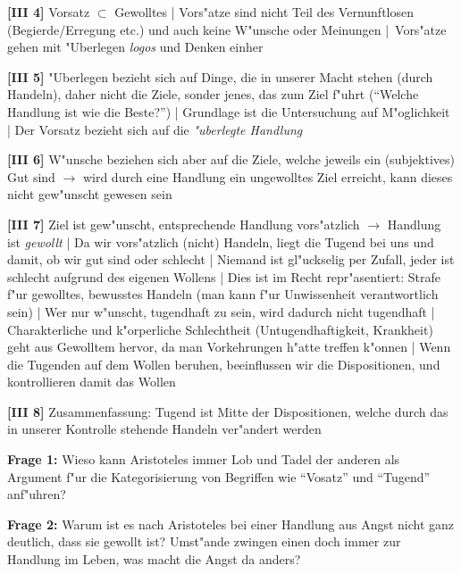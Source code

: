 \documentclass[emulatestandardclasses]{scrartcl}
\begin{document}
\noindent \textbf{[III 4]} Vorsatz $\subset$ Gewolltes | Vors"atze sind nicht Teil des Vernunftlosen (Begierde/Erregung etc.) und auch keine W"unsche oder Meinungen | Vors"atze gehen mit "Uberlegen \emph{logos} und Denken einher\newline

\noindent \textbf{[III 5]} "Uberlegen bezieht sich auf Dinge, die in unserer Macht stehen (durch Handeln), daher nicht die Ziele, sonder jenes, das zum Ziel f"uhrt ("`Welche Handlung ist wie die Beste?"') | Grundlage ist die Untersuchung auf M"oglichkeit | Der Vorsatz bezieht sich auf die \emph{"uberlegte Handlung}\newline

\noindent \textbf{[III 6]} W"unsche beziehen sich aber auf die Ziele, welche jeweils ein (subjektives) Gut sind $\rightarrow$ wird durch eine Handlung ein ungewolltes Ziel erreicht, kann dieses nicht gew"unscht gewesen sein \newline

\noindent \textbf{[III 7]} Ziel ist gew"unscht, entsprechende Handlung vors"atzlich $\rightarrow$ Handlung ist \emph{gewollt} | Da wir vors"atzlich (nicht) Handeln, liegt die Tugend bei uns und damit, ob wir gut sind oder schlecht | Niemand ist gl"uckselig per Zufall, jeder ist schlecht aufgrund des eigenen Wollens | Dies ist im Recht repr"asentiert: Strafe f"ur gewolltes, bewusstes Handeln (man kann f"ur Unwissenheit verantwortlich sein) | Wer nur w"unscht, tugendhaft zu sein, wird dadurch nicht tugendhaft | Charakterliche und k"orperliche Schlechtheit (Untugendhaftigkeit, Krankheit) geht aus Gewolltem hervor, da man Vorkehrungen h"atte treffen k"onnen | Wenn die Tugenden auf dem Wollen beruhen, beeinflussen wir die Dispositionen, und kontrollieren damit das Wollen\newline

\noindent \textbf{[III 8]} Zusammenfassung: Tugend ist Mitte der Dispositionen, welche durch das in unserer Kontrolle stehende Handeln ver"andert werden\newline


\noindent \textbf{Frage 1:} Wieso kann Aristoteles immer Lob und Tadel der anderen als Argument f"ur die Kategorisierung von Begriffen wie "`Vosatz"' und "`Tugend"' anf"uhren? \newline

\noindent \textbf{Frage 2:} Warum ist es nach Aristoteles bei einer Handlung aus Angst nicht ganz deutlich, dass sie gewollt ist? Umst"ande zwingen einen doch immer zur Handlung im Leben, was macht die Angst da anders? 
\end{document}
